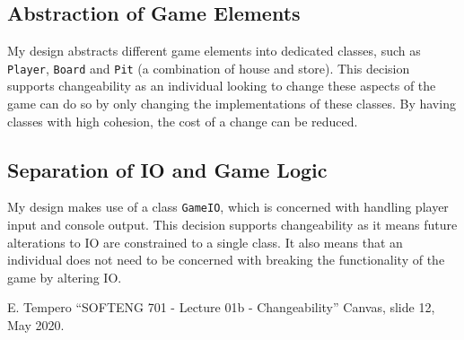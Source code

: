 \documentclass[10pt, a4paper, conference]{IEEEtran}
\begin{document}
\subsection{Abstraction of Game Elements}
My design abstracts different game elements into dedicated classes, such as
\texttt{Player}, \texttt{Board} and \texttt{Pit} (a combination of house and
store). This decision supports changeability as an individual looking to change
these aspects of the game can do so by only changing the implementations of
these classes. By having classes with high cohesion, the cost of a change can
be reduced.

\subsection{Separation of IO and Game Logic}
My design makes use of a class \texttt{GameIO}, which 
is concerned with handling player input and console output.
This decision supports changeability as it means future alterations to IO are
constrained to a single class. It also means that an individual does not need
to be concerned with breaking the functionality of the game by altering IO.

\begin{thebibliography}{00}
 E. Tempero ``SOFTENG 701 - Lecture 01b
  - Changeability'' Canvas, slide 12, May 2020.
\end{thebibliography}
\end{document}
